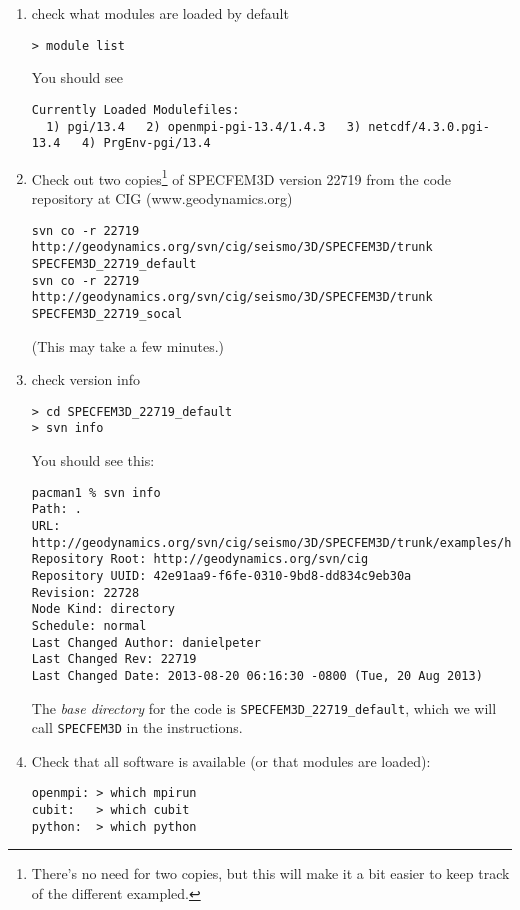 \documentclass[10pt,titlepage,fleqn]{article}
\begin{document}
\begin{enumerate}
\item check what modules are loaded by default
\begin{verbatim}
> module list
\end{verbatim}

You should see
\begin{verbatim}
Currently Loaded Modulefiles:
  1) pgi/13.4   2) openmpi-pgi-13.4/1.4.3   3) netcdf/4.3.0.pgi-13.4   4) PrgEnv-pgi/13.4
\end{verbatim}

\item Check out two copies\footnote{There's no need for two copies, but this will make it a bit easier to keep track of the different exampled.} of SPECFEM3D version 22719 from the code repository at CIG (www.geodynamics.org)
%
\begin{verbatim}
svn co -r 22719 http://geodynamics.org/svn/cig/seismo/3D/SPECFEM3D/trunk SPECFEM3D_22719_default
svn co -r 22719 http://geodynamics.org/svn/cig/seismo/3D/SPECFEM3D/trunk SPECFEM3D_22719_socal
\end{verbatim}
%
(This may take a few minutes.)

\item check version info
%
\begin{verbatim}
> cd SPECFEM3D_22719_default
> svn info
\end{verbatim}

You should see this:
\begin{verbatim}
pacman1 % svn info
Path: .
URL: http://geodynamics.org/svn/cig/seismo/3D/SPECFEM3D/trunk/examples/homogeneous_halfspace_HEX8_elastic_absorbing_Stacey_5sides
Repository Root: http://geodynamics.org/svn/cig
Repository UUID: 42e91aa9-f6fe-0310-9bd8-dd834c9eb30a
Revision: 22728
Node Kind: directory
Schedule: normal
Last Changed Author: danielpeter
Last Changed Rev: 22719
Last Changed Date: 2013-08-20 06:16:30 -0800 (Tue, 20 Aug 2013)
\end{verbatim}

The {\em base directory} for the code is \verb+SPECFEM3D_22719_default+, which we will call \verb+SPECFEM3D+ in the instructions.

\item Check that all software is available (or that modules are loaded):
\begin{verbatim}
openmpi: > which mpirun
cubit:   > which cubit
python:  > which python
\end{verbatim}


\end{enumerate}
\end{document}

